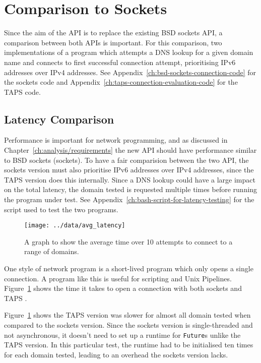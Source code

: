 \section{Comparison to Sockets}\label{sec:comparison-to-sockets}
Since the aim of the API is to replace the existing BSD sockets API, a comparison between both APIs is important.
For this comparison, two implementations of a program which attempts a DNS lookup for a given domain name and connects
to first successful connection attempt, prioritising IPv6 addresses over IPv4 addresses.
See Appendix~\ref{ch:bsd-sockets-connection-code} for the sockets code and Appendix~\ref{ch:taps-connection-evaluation-code}
for the TAPS code.

\subsection{Latency Comparison}\label{subsec:latency-comparison}
Performance is important for network programming, and as discussed in Chapter~\ref{ch:analysis/requirements} the new
API should have performance similar to BSD sockets (sockets).
To have a fair comparision between the two API, the sockets version must also prioritise IPv6 addresses over IPv4
addresses, since the TAPS version does this internally.
Since a DNS lookup could have a large impact on the total latency, the domain tested is requested multiple times before
running the program under test.
See Appendix~\ref{ch:bash-script-for-latency-testing} for the script used to test the two programs.

\begin{figure}[h]
    \texttt{[image: ../data/avg\_latency]}
    \caption{A graph to show the average time over 10 attempts to connect to a range of domains.}
    \label{fig:latency}
\end{figure}

One style of network program is a short-lived program which only opens a single connection.
A program like this is useful for scripting and Unix Pipelines.
Figure~\ref{fig:latency} shows the time it takes to open a connection with both sockets and TAPS .

Figure~\ref{fig:latency} shows the TAPS version was slower for almost all domain tested when compared to the sockets
version.
Since the sockets version is single-threaded and not asynchronous, it doesn't need to set up a runtime for
\texttt{Future}s unlike the TAPS version.
In this particular test, the runtime had to be initialised ten times for each domain tested, leading to an overhead the
sockets version lacks.

